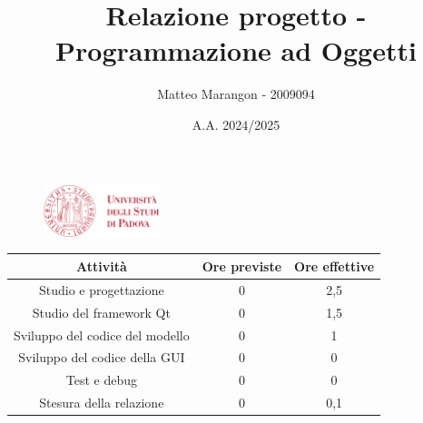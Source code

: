 \documentclass[10pt]{article}
\title{Relazione progetto - Programmazione ad Oggetti}
\author{Matteo Marangon - 2009094}
\date{A.A. 2024/2025}
\begin{document}
\begin{figure}
    \centering
    \includegraphics[width=0.3\textwidth]{./unipdlogo.png}
\end{figure}
\maketitle

\newpage

\tableofcontents
\newpage

\begin{center}
    \begin{tabular}{| c | c | c |} \hline
    Attività & Ore previste & Ore effettive \\\hline
    Studio e progettazione & 0 & 2,5 \\
    Studio del framework Qt & 0 & 1,5 \\
    Sviluppo del codice del modello & 0 & 1 \\
    Sviluppo del codice della GUI & 0 & 0 \\
    Test e debug & 0 & 0 \\
    Stesura della relazione & 0 & 0,1 \\\hline
    \end{tabular}
\end{center}
\end{document}
